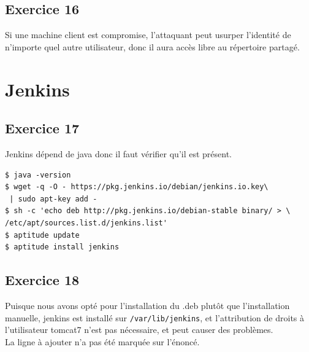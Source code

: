 \documentclass{report}
\begin{document}
\subsection{Exercice 16}
Si une machine client est compromise, l'attaquant peut usurper l'identité de
n'importe quel autre utilisateur, donc il aura accès libre au répertoire partagé.
\section{Jenkins}
\subsection{Exercice 17}
Jenkins dépend de java donc il faut vérifier qu'il est présent.
\begin{tcolorbox}
  \begin{verbatim}
$ java -version
$ wget -q -O - https://pkg.jenkins.io/debian/jenkins.io.key\
 | sudo apt-key add -
$ sh -c 'echo deb http://pkg.jenkins.io/debian-stable binary/ > \
/etc/apt/sources.list.d/jenkins.list'
$ aptitude update
$ aptitude install jenkins
  \end{verbatim}
\end{tcolorbox}
\subsection{Exercice 18}
Puisque nous avons opté pour l'installation du .deb plutôt que l'installation
manuelle, jenkins est installé sur \texttt{/var/lib/jenkins}, et l'attribution
de droits à l'utilisateur tomcat7 n'est pas nécessaire, et peut causer des problèmes.
\\
La ligne à ajouter n'a pas été marquée sur l'énoncé.
\end{document}
